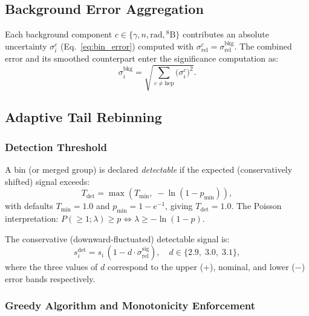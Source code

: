 \documentclass[12pt,a4paper]{article}
\newcommand{\si}{s_{i}}                  %
\newcommand{\srel}{\sigma_{\mathrm{rel}}}
\begin{document}
\subsection{Background Error Aggregation}
\label{sec:hep_bkg_error}

Each background component $c \in \{\gamma, n, \mathrm{rad}, {}^8\mathrm{B}\}$
contributes an absolute uncertainty $\sigma_i^c$ (Eq.~\eqref{eq:bin_error})
computed with $\srel^c = \srel^{\mathrm{bkg}}$.
The combined error and its smoothed counterpart enter the significance
computation as:
\begin{equation}
  \sigma_i^{\mathrm{bkg}} = \sqrt{\sum_{c \neq \mathrm{hep}} \bigl(\sigma_i^c\bigr)^2}.
  \label{eq:hep_combined_err}
\end{equation}

\subsection{Adaptive Tail Rebinning}
\label{sec:rebin}

\subsubsection{Detection Threshold}
\label{sec:detection_threshold}

A bin (or merged group) is declared \emph{detectable} if the expected
(conservatively shifted) signal exceeds:
\begin{equation}
  T_{\mathrm{det}} = \max\!\left(T_{\mathrm{min}},\;-\ln(1-p_{\mathrm{min}})\right),
  \label{eq:detection_threshold}
\end{equation}
with defaults $T_{\mathrm{min}}=1.0$ and $p_{\mathrm{min}}=1-e^{-1}$,
giving $T_{\mathrm{det}}=1.0$.
The Poisson interpretation: $P(\ge 1;\lambda)\ge p \Leftrightarrow \lambda\ge -\ln(1-p)$.

The conservative (downward-fluctuated) detectable signal is:
\begin{equation}
  s_i^{\mathrm{det}} = \si\,(1 - d\cdot\srel^{\mathrm{sig}}),
  \quad d \in \{2.9,\;3.0,\;3.1\},
  \label{eq:detectable_signal}
\end{equation}
where the three values of $d$ correspond to the upper (+), nominal, and
lower ($-$) error bands respectively.

\subsubsection{Greedy Algorithm and Monotonicity Enforcement}
\end{document}
